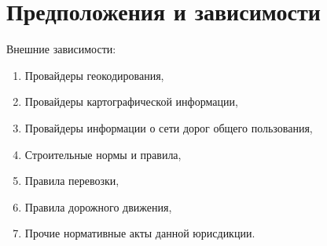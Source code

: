 \section{Предположения и зависимости}
\label{sec:dep}

Внешние зависимости:
\begin{enumerate}
    \item Провайдеры геокодирования,
    \item Провайдеры картографической информации,
    \item Провайдеры информации о сети дорог общего пользования,
    \item Строительные нормы и правила,
    \item Правила перевозки,
    \item Правила дорожного движения,
    \item Прочие нормативные акты данной юрисдикции.
\end{enumerate}

\endinput
